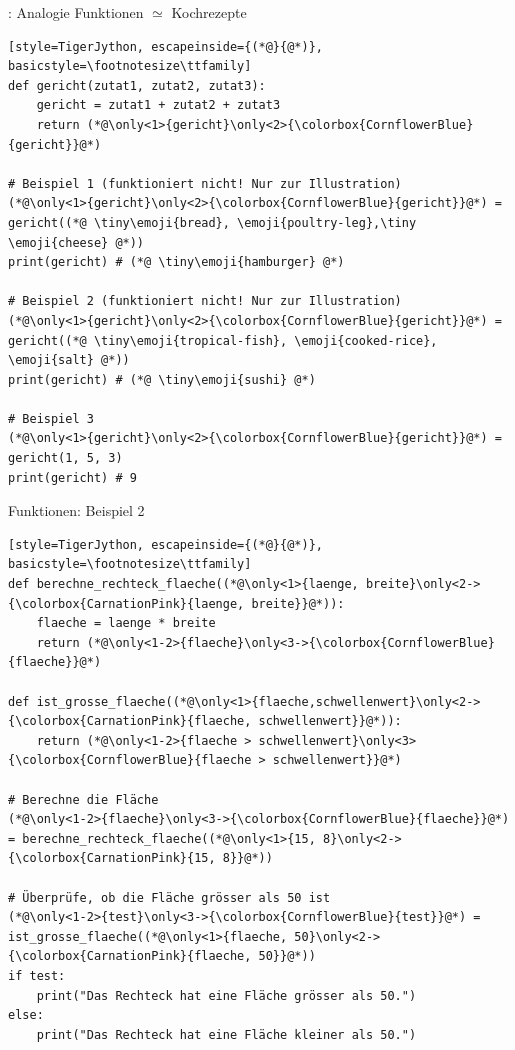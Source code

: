 \begin{frame}[fragile]{: Analogie }
Funktionen $\simeq$ Kochrezepte

\begin{lstlisting}[style=TigerJython, escapeinside={(*@}{@*)}, basicstyle=\footnotesize\ttfamily]
def gericht(zutat1, zutat2, zutat3):
    gericht = zutat1 + zutat2 + zutat3
    return (*@\only<1>{gericht}\only<2>{\colorbox{CornflowerBlue}{gericht}}@*)

# Beispiel 1 (funktioniert nicht! Nur zur Illustration)
(*@\only<1>{gericht}\only<2>{\colorbox{CornflowerBlue}{gericht}}@*) = gericht((*@ \tiny\emoji{bread}, \emoji{poultry-leg},\tiny \emoji{cheese} @*))
print(gericht) # (*@ \tiny\emoji{hamburger} @*)

# Beispiel 2 (funktioniert nicht! Nur zur Illustration)
(*@\only<1>{gericht}\only<2>{\colorbox{CornflowerBlue}{gericht}}@*) = gericht((*@ \tiny\emoji{tropical-fish}, \emoji{cooked-rice}, \emoji{salt} @*))
print(gericht) # (*@ \tiny\emoji{sushi} @*)

# Beispiel 3    
(*@\only<1>{gericht}\only<2>{\colorbox{CornflowerBlue}{gericht}}@*) = gericht(1, 5, 3)
print(gericht) # 9
\end{lstlisting}
\end{frame}

\begin{frame}[fragile]{Funktionen: Beispiel 2}
\begin{lstlisting}[style=TigerJython, escapeinside={(*@}{@*)}, basicstyle=\footnotesize\ttfamily]
def berechne_rechteck_flaeche((*@\only<1>{laenge, breite}\only<2->{\colorbox{CarnationPink}{laenge, breite}}@*)):
    flaeche = laenge * breite
    return (*@\only<1-2>{flaeche}\only<3->{\colorbox{CornflowerBlue}{flaeche}}@*)

def ist_grosse_flaeche((*@\only<1>{flaeche,schwellenwert}\only<2->{\colorbox{CarnationPink}{flaeche, schwellenwert}}@*)):
    return (*@\only<1-2>{flaeche > schwellenwert}\only<3>{\colorbox{CornflowerBlue}{flaeche > schwellenwert}}@*)

# Berechne die Fläche
(*@\only<1-2>{flaeche}\only<3->{\colorbox{CornflowerBlue}{flaeche}}@*) = berechne_rechteck_flaeche((*@\only<1>{15, 8}\only<2->{\colorbox{CarnationPink}{15, 8}}@*))

# Überprüfe, ob die Fläche grösser als 50 ist
(*@\only<1-2>{test}\only<3->{\colorbox{CornflowerBlue}{test}}@*) = ist_grosse_flaeche((*@\only<1>{flaeche, 50}\only<2->{\colorbox{CarnationPink}{flaeche, 50}}@*))
if test:
    print("Das Rechteck hat eine Fläche grösser als 50.")
else:
    print("Das Rechteck hat eine Fläche kleiner als 50.")
\end{lstlisting}
\end{frame}

